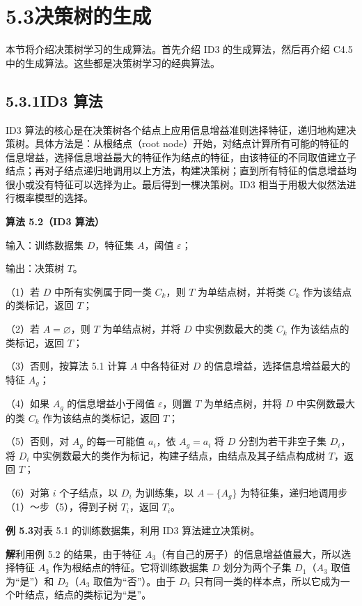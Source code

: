 \documentclass[UTF8,12pt,a4paper,fontset=fandol]{ctexart}
\begin{document}
\section*{5.3\quad 决策树的生成}

本节将介绍决策树学习的生成算法。首先介绍 ID3 的生成算法，然后再介绍 C4.5 中的生成算法。这些都是决策树学习的经典算法。

\subsection*{5.3.1\quad ID3 算法}

ID3 算法的核心是在决策树各个结点上应用信息增益准则选择特征，递归地构建决策树。具体方法是：从根结点（root node）开始，对结点计算所有可能的特征的信息增益，选择信息增益最大的特征作为结点的特征，由该特征的不同取值建立子结点；再对子结点递归地调用以上方法，构建决策树；直到所有特征的信息增益均很小或没有特征可以选择为止。最后得到一棵决策树。ID3 相当于用极大似然法进行概率模型的选择。

\noindent\textbf{算法 5.2（ID3 算法）}

输入：训练数据集 $D$，特征集 $A$，阈值 $\varepsilon$；

输出：决策树 $T$。

（1）若 $D$ 中所有实例属于同一类 $C_k$，则 $T$ 为单结点树，并将类 $C_k$ 作为该结点的类标记，返回 $T$；

（2）若 $A=\varnothing$，则 $T$ 为单结点树，并将 $D$ 中实例数最大的类 $C_k$ 作为该结点的类标记，返回 $T$；

（3）否则，按算法 5.1 计算 $A$ 中各特征对 $D$ 的信息增益，选择信息增益最大的特征 $A_g$；

（4）如果 $A_g$ 的信息增益小于阈值 $\varepsilon$，则置 $T$ 为单结点树，并将 $D$ 中实例数最大的类 $C_k$ 作为该结点的类标记，返回 $T$；

（5）否则，对 $A_g$ 的每一可能值 $a_i$，依 $A_g=a_i$ 将 $D$ 分割为若干非空子集 $D_i$，将 $D_i$ 中实例数最大的类作为标记，构建子结点，由结点及其子结点构成树 $T$，返回 $T$；

（6）对第 $i$ 个子结点，以 $D_i$ 为训练集，以 $A-\{A_g\}$ 为特征集，递归地调用步（1）～步（5），得到子树 $T_i$，返回 $T_i$。

\noindent\textbf{例 5.3}\quad 对表 5.1 的训练数据集，利用 ID3 算法建立决策树。

\noindent\textbf{解}\quad 利用例 5.2 的结果，由于特征 $A_3$（有自己的房子）的信息增益值最大，所以选择特征 $A_3$ 作为根结点的特征。它将训练数据集 $D$ 划分为两个子集 $D_1$（$A_3$ 取值为“是”）和 $D_2$（$A_3$ 取值为“否”）。由于 $D_1$ 只有同一类的样本点，所以它成为一个叶结点，结点的类标记为“是”。
\end{document}
